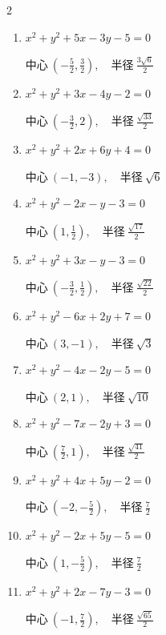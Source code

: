 \begin{multicols}{2}
\begin{enumerate}
\resetques

  \item $x^{2}+y^{2}+5x-3y-5=0$

        $\displaystyle 中心\: \left(-\frac{5}{2},\frac{3}{2}\right), \quad 半径 \ \frac{3\sqrt{6}}{2}$

  \item $x^{2}+y^{2}+3x-4y-2=0$

        $\displaystyle 中心\: \left(-\frac{3}{2},2\right), \quad 半径 \ \frac{\sqrt{33}}{2}$

  \item $x^{2}+y^{2}+2x+6y+4=0$

        $\displaystyle 中心\: \left(-1,-3\right), \quad 半径 \ \sqrt{6}$

  \item $x^{2}+y^{2}-2x-y-3=0$

        $\displaystyle 中心\: \left(1,\frac{1}{2}\right), \quad 半径 \ \frac{\sqrt{17}}{2}$

  \item $x^{2}+y^{2}+3x-y-3=0$

        $\displaystyle 中心\: \left(-\frac{3}{2},\frac{1}{2}\right), \quad 半径 \ \frac{\sqrt{22}}{2}$

  \item $x^{2}+y^{2}-6x+2y+7=0$

        $\displaystyle 中心\: \left(3,-1\right), \quad 半径 \ \sqrt{3}$

  \item $x^{2}+y^{2}-4x-2y-5=0$

        $\displaystyle 中心\: \left(2,1\right), \quad 半径 \ \sqrt{10}$

  \item $x^{2}+y^{2}-7x-2y+3=0$

        $\displaystyle 中心\: \left(\frac{7}{2},1\right), \quad 半径 \ \frac{\sqrt{41}}{2}$

  \item $x^{2}+y^{2}+4x+5y-2=0$

        $\displaystyle 中心\: \left(-2,-\frac{5}{2}\right), \quad 半径 \ \frac{7}{2}$

  \item $x^{2}+y^{2}-2x+5y-5=0$

        $\displaystyle 中心\: \left(1,-\frac{5}{2}\right), \quad 半径 \ \frac{7}{2}$

  \item $x^{2}+y^{2}+2x-7y-3=0$

        $\displaystyle 中心\: \left(-1,\frac{7}{2}\right), \quad 半径 \ \frac{\sqrt{65}}{2}$


\end{enumerate}
\end{multicols}
